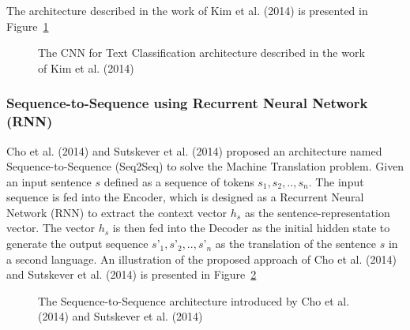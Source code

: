 \documentclass[pdflatex,sn-mathphys]{sn-jnl}%
\theoremstyle{thmstyleone}%
\theoremstyle{thmstyletwo}%
\theoremstyle{thmstylethree}%
\begin{document}
The architecture described in the work of Kim et al. (2014) is presented in Figure~\ref{fig:kim2014}

\begin{figure}[htp]
\centering
{}
\caption{The CNN for Text Classification architecture described in the work of Kim et al. (2014)\cite{Kim2014}}
\label{fig:kim2014}
\end{figure}

\subsubsection{Sequence-to-Sequence using Recurrent Neural Network (RNN)}
Cho et al. (2014) and Sutskever et al. (2014)\cite{Cho2014, Sutskever2014} proposed an architecture named Sequence-to-Sequence (Seq2Seq) to solve the Machine Translation problem. Given an input sentence $s$ defined as a sequence of tokens $s_1, s_2, .., s_n$. The input sequence is fed into the Encoder, which is designed as a Recurrent Neural Network (RNN) to extract the context vector $h_s$ as the sentence-representation vector. The vector $h_s$ is then fed into the Decoder as the initial hidden state to generate the output sequence $s’_1, s’_2, .., s’_n$ as the translation of the sentence $s$ in a second language. An illustration of the proposed approach of Cho et al. (2014) and Sutskever et al. (2014) is presented in Figure~\ref{fig:seq2seq}

\begin{figure}[htp]
\centering
{}
\caption{The Sequence-to-Sequence architecture introduced by Cho et al. (2014) and Sutskever et al. (2014)\cite{Cho2014, Sutskever2014}}
\label{fig:seq2seq}
\end{figure}
\end{document}
